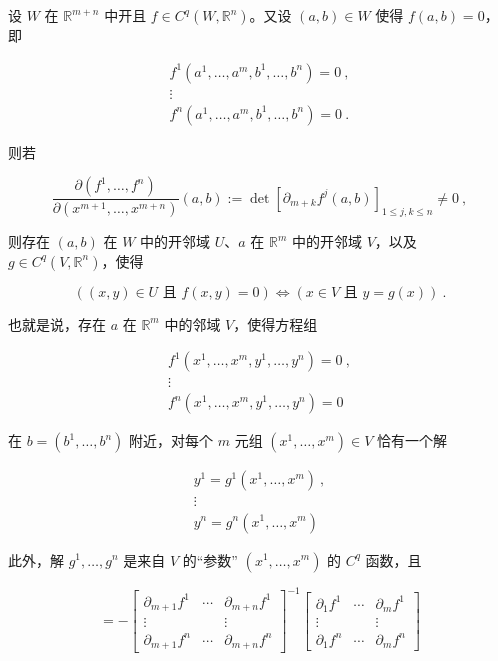 \begin{corollary}

设 $ W $ 在 $ \mathbb{R}^{m+n} $ 中开且 $ f\in C^{q}(W,\mathbb{R}^{n}) $。又设 $ (a,b)\in W $ 使得 $ f(a,b)=0 $，即

\begin{equation*}
\begin{array}{c}f^{1}(a^{1},\ldots,a^{m},b^{1},\ldots,b^{n})=0\ ,\\ \vdots\\ f^{n}(a^{1},\ldots,a^{m},b^{1},\ldots,b^{n})=0\ .\end{array}
\end{equation*}

则若

\[
\frac{\partial(f^{1},\ldots,f^{n})}{\partial(x^{m+1},\ldots,x^{m+n})}(a,b):=\det\left[\partial_{m+k}f^{j}(a,b)\right]_{1\le j,k\le n}\ne 0\ ,
\]

则存在 $ (a,b) $ 在 $ W $ 中的开邻域 $ U $、$ a $ 在 $ \mathbb{R}^{m} $ 中的开邻域 $ V $，以及 $ g\in C^{q}(V,\mathbb{R}^{n}) $，使得

\[
\left((x,y)\in U\text{ 且 }f(x,y)=0\right)\iff\left(x\in V\text{ 且 }y=g(x)\right) \ .
\]

也就是说，存在 $ a $ 在 $ \mathbb{R}^{m} $ 中的邻域 $ V $，使得方程组

\begin{equation*}
\begin{array}{c}f^{1}(x^{1},\ldots,x^{m},y^{1},\ldots,y^{n})=0\ ,\\ \vdots\\ f^{n}(x^{1},\ldots,x^{m},y^{1},\ldots,y^{n})=0\end{array}
\end{equation*}

在 $ b=(b^{1},\ldots,b^{n}) $ 附近，对每个 $ m $ 元组 $ (x^{1},\ldots,x^{m})\in V $ 恰有一个解

\begin{equation*}
\begin{array}{c}y^{1}=g^{1}(x^{1},\ldots,x^{m})\ ,\\ \vdots\\ y^{n}=g^{n}(x^{1},\ldots,x^{m})\end{array}
\end{equation*}

此外，解 $ g^{1},\ldots,g^{n} $ 是来自 $ V $ 的“参数” $ (x^{1},\ldots,x^{m}) $ 的 $ C^{q} $ 函数，且

\begin{equation*}
[\partial g(x)]=-\begin{bmatrix}\partial_{m+1}f^{1} & \cdots & \partial_{m+n}f^{1}\\ \vdots & & \vdots\\ \partial_{m+1}f^{n} & \cdots & \partial_{m+n}f^{n}\end{bmatrix}^{-1}\begin{bmatrix}\partial_{1}f^{1} & \cdots & \partial_{m}f^{1}\\ \vdots & & \vdots\\ \partial_{1}f^{n} & \cdots & \partial_{m}f^{n}\end{bmatrix}
\end{equation*}


\end{corollary}
